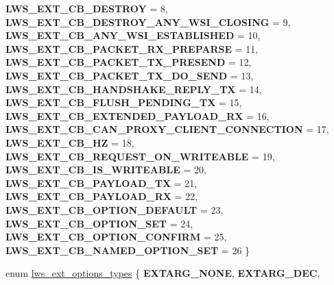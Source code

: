 \begin{DoxyCompactItemize}
{\bfseries L\+W\+S\+\_\+\+E\+X\+T\+\_\+\+C\+B\+\_\+\+D\+E\+S\+T\+R\+OY} = 8, 
\newline
{\bfseries L\+W\+S\+\_\+\+E\+X\+T\+\_\+\+C\+B\+\_\+\+D\+E\+S\+T\+R\+O\+Y\+\_\+\+A\+N\+Y\+\_\+\+W\+S\+I\+\_\+\+C\+L\+O\+S\+I\+NG} = 9, 
{\bfseries L\+W\+S\+\_\+\+E\+X\+T\+\_\+\+C\+B\+\_\+\+A\+N\+Y\+\_\+\+W\+S\+I\+\_\+\+E\+S\+T\+A\+B\+L\+I\+S\+H\+ED} = 10, 
{\bfseries L\+W\+S\+\_\+\+E\+X\+T\+\_\+\+C\+B\+\_\+\+P\+A\+C\+K\+E\+T\+\_\+\+R\+X\+\_\+\+P\+R\+E\+P\+A\+R\+SE} = 11, 
{\bfseries L\+W\+S\+\_\+\+E\+X\+T\+\_\+\+C\+B\+\_\+\+P\+A\+C\+K\+E\+T\+\_\+\+T\+X\+\_\+\+P\+R\+E\+S\+E\+ND} = 12, 
\newline
{\bfseries L\+W\+S\+\_\+\+E\+X\+T\+\_\+\+C\+B\+\_\+\+P\+A\+C\+K\+E\+T\+\_\+\+T\+X\+\_\+\+D\+O\+\_\+\+S\+E\+ND} = 13, 
{\bfseries L\+W\+S\+\_\+\+E\+X\+T\+\_\+\+C\+B\+\_\+\+H\+A\+N\+D\+S\+H\+A\+K\+E\+\_\+\+R\+E\+P\+L\+Y\+\_\+\+TX} = 14, 
{\bfseries L\+W\+S\+\_\+\+E\+X\+T\+\_\+\+C\+B\+\_\+\+F\+L\+U\+S\+H\+\_\+\+P\+E\+N\+D\+I\+N\+G\+\_\+\+TX} = 15, 
{\bfseries L\+W\+S\+\_\+\+E\+X\+T\+\_\+\+C\+B\+\_\+\+E\+X\+T\+E\+N\+D\+E\+D\+\_\+\+P\+A\+Y\+L\+O\+A\+D\+\_\+\+RX} = 16, 
\newline
{\bfseries L\+W\+S\+\_\+\+E\+X\+T\+\_\+\+C\+B\+\_\+\+C\+A\+N\+\_\+\+P\+R\+O\+X\+Y\+\_\+\+C\+L\+I\+E\+N\+T\+\_\+\+C\+O\+N\+N\+E\+C\+T\+I\+ON} = 17, 
{\bfseries L\+W\+S\+\_\+\+E\+X\+T\+\_\+\+C\+B\+\_\+HZ} = 18, 
{\bfseries L\+W\+S\+\_\+\+E\+X\+T\+\_\+\+C\+B\+\_\+\+R\+E\+Q\+U\+E\+S\+T\+\_\+\+O\+N\+\_\+\+W\+R\+I\+T\+E\+A\+B\+LE} = 19, 
{\bfseries L\+W\+S\+\_\+\+E\+X\+T\+\_\+\+C\+B\+\_\+\+I\+S\+\_\+\+W\+R\+I\+T\+E\+A\+B\+LE} = 20, 
\newline
{\bfseries L\+W\+S\+\_\+\+E\+X\+T\+\_\+\+C\+B\+\_\+\+P\+A\+Y\+L\+O\+A\+D\+\_\+\+TX} = 21, 
{\bfseries L\+W\+S\+\_\+\+E\+X\+T\+\_\+\+C\+B\+\_\+\+P\+A\+Y\+L\+O\+A\+D\+\_\+\+RX} = 22, 
{\bfseries L\+W\+S\+\_\+\+E\+X\+T\+\_\+\+C\+B\+\_\+\+O\+P\+T\+I\+O\+N\+\_\+\+D\+E\+F\+A\+U\+LT} = 23, 
{\bfseries L\+W\+S\+\_\+\+E\+X\+T\+\_\+\+C\+B\+\_\+\+O\+P\+T\+I\+O\+N\+\_\+\+S\+ET} = 24, 
\newline
{\bfseries L\+W\+S\+\_\+\+E\+X\+T\+\_\+\+C\+B\+\_\+\+O\+P\+T\+I\+O\+N\+\_\+\+C\+O\+N\+F\+I\+RM} = 25, 
{\bfseries L\+W\+S\+\_\+\+E\+X\+T\+\_\+\+C\+B\+\_\+\+N\+A\+M\+E\+D\+\_\+\+O\+P\+T\+I\+O\+N\+\_\+\+S\+ET} = 26
 \}
\item 
enum \hyperlink{group__extensions_gacc9f55936dc165257a2e1f7d47bce89e}{lws\+\_\+ext\+\_\+options\+\_\+types} \{ \newline
{\bfseries E\+X\+T\+A\+R\+G\+\_\+\+N\+O\+NE}, 
{\bfseries E\+X\+T\+A\+R\+G\+\_\+\+D\+EC}, 

\end{DoxyCompactItemize}
